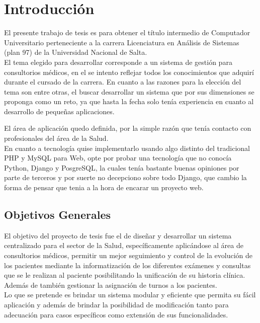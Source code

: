 ﻿\chapter{Introducción}

El presente trabajo de tesis es para obtener el título intermedio de Computador Universitario perteneciente a la carrera Licenciatura en Análisis de Sistemas (plan 97) de la Universidad Nacional de Salta.\\[0.1cm]

El tema elegido para desarrollar corresponde a un sistema de gestión para consultorios médicos, en el se intento reflejar todos los conocimientos que adquirí durante el cursado de la carrera. En cuanto a las razones para la elección del tema son entre otras, el buscar desarrollar un sistema que por sus dimensiones se proponga como un reto, ya que hasta la fecha solo tenía experiencia en cuanto al desarrollo de pequeñas aplicaciones. 

El área de aplicación quedo definida, por la simple razón que tenía contacto con profesionales del área de la Salud.\\[0.1cm]

En cuanto a tecnología quise implementarlo usando algo distinto del tradicional PHP y MySQL para Web, opte por probar una tecnología que no conocía Python, Django y PosgreSQL, la cuales tenía bastante buenas opiniones por parte de terceros y por suerte no decepciono sobre todo Django, que cambio la forma de pensar que tenia a la hora de encarar un proyecto web.\\[0.1cm]


\section{Objetivos Generales}

El objetivo del proyecto de tesis fue el de diseñar y desarrollar un sistema centralizado para el sector de la Salud, específicamente aplicándose al área de consultorios médicos, permitir un mejor seguimiento y control de la evolución de los pacientes mediante la informatización de los diferentes exámenes y consultas que se le realizan al paciente posibilitando la unificación de su historia clínica. Además de también gestionar la asignación de turnos a los pacientes.\\[0.1cm]

Lo que se pretende es brindar un sistema modular y eficiente que permita su fácil aplicación y además de brindar la posibilidad de modificación tanto para adecuación para casos específicos como extensión de sus funcionalidades.\\[0.1cm]


